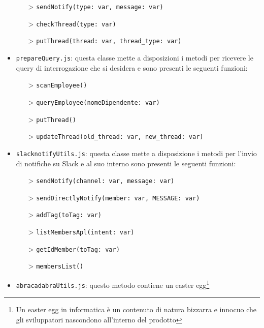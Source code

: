 \begin{itemize}
    \begin{itemize}
        \item[>] \texttt{sendNotify(type: var, message: var)}
        \item[>] \texttt{checkThread(type: var)}
        \item[>] \texttt{putThread(thread: var, thread\_type: var)}
    \end{itemize}
    \item \texttt{prepareQuery.js}: questa classe mette a disposizioni i metodi per ricevere le query di interrogazione che si desidera e sono presenti le seguenti funzioni:
    \begin{itemize}
        \item[>] \texttt{scanEmployee()}
        \item[>] \texttt{queryEmployee(nomeDipendente: var)}
        \item[>] \texttt{putThread()}
        \item[>] \texttt{updateThread(old\_thread: var, new\_thread: var)}
    \end{itemize}
    \item \texttt{slacknotifyUtils.js}: questa classe mette a disposizione i metodi per l'invio di notifiche su Slack e al suo interno sono presenti le seguenti funzioni:
    \begin{itemize}
        \item[>] \texttt{sendNotify(channel: var, message: var)}
        \item[>] \texttt{sendDirectlyNotify(member: var, MESSAGE: var)}
        \item[>] \texttt{addTag(toTag: var)}
        \item[>] \texttt{listMembersApl(intent: var)}
        \item[>] \texttt{getIdMember(toTag: var)}
        \item[>] \texttt{membersList()}
    \end{itemize}
    \item \texttt{abracadabraUtils.js}: questo metodo contiene un easter egg\footnote{Un easter egg in informatica è un contenuto di natura bizzarra e innocuo che gli sviluppatori nascondono all'interno del prodotto}
\end{itemize}
